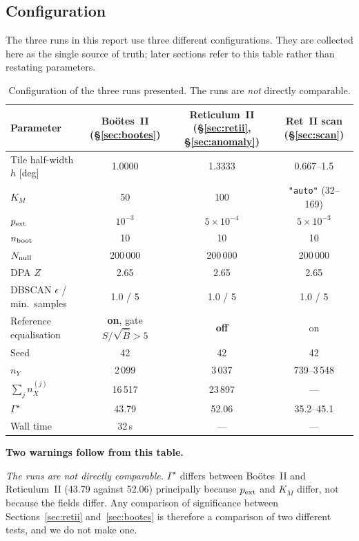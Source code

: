 \documentclass[11pt,a4paper]{article}
\newcommand{\Gstar}{\Gamma^{\star}}
\newcommand{\Bhat}{\hat{B}}
\newcommand{\srb}{S/\sqrt{\Bhat}}
\begin{document}
\subsection{Configuration}
\label{sec:config}

The three runs in this report use three different configurations. They are collected here as the
single source of truth; later sections refer to this table rather than restating parameters.

\begin{table}[h]
\centering\small
\caption{Configuration of the three runs presented. The runs are \emph{not} directly comparable.}
\begin{tabular}{@{}lccc@{}}
\toprule
Parameter & Bo\"otes~II (\S\ref{sec:bootes}) & Reticulum~II (\S\ref{sec:retii}, \S\ref{sec:anomaly})
          & Ret~II scan (\S\ref{sec:scan})\\
\midrule
Tile half-width $h$ [deg]      & 1.0000 & 1.3333 & 0.667--1.5\\
$K_M$                          & 50 & 100 & \texttt{"auto"} (32--169)\\
$p_{\rm ext}$                  & $10^{-3}$ & $5\times10^{-4}$ & $5\times10^{-3}$\\
$n_{\rm boot}$                 & 10 & 10 & 10\\
$N_{\rm null}$                 & 200\,000 & 200\,000 & 200\,000\\
DPA $Z$                        & 2.65 & 2.65 & 2.65\\
DBSCAN $\epsilon$ / min.\ samples & 1.0 / 5 & 1.0 / 5 & 1.0 / 5\\
Reference equalisation         & \textbf{on}, gate $\srb > 5$ & \textbf{off} & on\\
Seed                           & 42 & 42 & 42\\
\midrule
$n_Y$                          & 2\,099 & 3\,037 & 739--3\,548\\
$\sum_j n_X^{(j)}$             & 16\,517 & 23\,897 & ---\\
$\Gstar$                       & 43.79 & 52.06 & 35.2--45.1\\
Wall time                      & 32\,s & --- & ---\\
\bottomrule
\end{tabular}
\end{table}

\textbf{Two warnings follow from this table.}

\emph{The runs are not directly comparable.} $\Gstar$ differs between Bo\"otes~II and
Reticulum~II (43.79 against 52.06) principally because $p_{\rm ext}$ and $K_M$ differ, not because
the fields differ. Any comparison of significance between Sections~\ref{sec:retii}
and~\ref{sec:bootes} is therefore a comparison of two different tests, and we do not make one.
\end{document}
